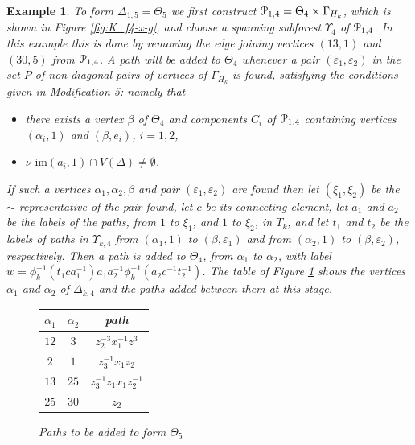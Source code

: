 \documentclass[a4paper,12pt]{article}
\renewcommand{\a}{\alpha }
\renewcommand{\b}{\beta }
\newcommand{\G}{\Gamma }
\newcommand{\D}{\Delta }
\newcommand{\e}{\varepsilon }
\newcommand{\T}{\Theta }
\newcommand{\U}{\Upsilon }
\newcommand{\cP}{{\cal{P}}}
\newcommand{\vim}{\nu\textrm{-im}}
\newtheorem{exam}[theorem]{Example}
\newenvironment{example}{\begin{exam} \rm}{\end{exam}}
\numberwithin{equation}{section}
\numberwithin{figure}{section}
\begin{document}
\begin{example}
To form $\D_{1,5}=\T_5$ we first construct $\cP_{1,4}=\T_4\times \G_{H_k}$,
which is shown in Figure \ref{fig:K_f4-x-g}, and choose a spanning
subforest $\U_4$ of $\cP_{1,4}$. In this example this is done by
removing the edge  joining vertices $(13,1)$ and $(30,5)$ from
$\cP_{1,4}$. A path will be added to $\T_4$ whenever a pair $(\e_1,\e_2)$
in the set $P$ of non-diagonal pairs of vertices of $\G_{H_k}$ is
found, satisfying the conditions given in Modification 5: namely
that
\begin{itemize}
\item
there exists a vertex $\b$ of $\T_4$ and  
components $C_i$ of $\cP_{1,4}$ containing vertices
$(\a_i,1)$ and $(\b, e_i)$, $i=1,2$, 
\item $\vim(a_i,1)\cap V(\D)\neq \emptyset$.
\end{itemize}
If such a vertices $\a_1,\a_2,\b$ and pair $(\e_1,\e_2)$ are found then 
let $(\xi_1,\xi_2)$ be the  $\sim$ representative of the pair found, let
$c$ be its connecting element, let $a_1$ and $a_2$ be the labels of  the paths, from
$1$ to $\xi_1$, and $1$ to $\xi_2$, in $T_k$, and let $t_1$ and $t_2$ be
the labels of paths in $\U_{k,4}$ from $(\a_1,1)$ to $(\b,\e_1)$ and 
from $(\a_2,1)$ to $(\b,\e_2)$, respectively. 
 Then a path is 
added to
$\T_4$, from $\a_1$ to $\a_2$, with label  $w=\phi_k^{-1}(t_1ca_1^{-1})a_1a_2^{-1}\phi_k^{-1}(a_2c^{-1}t_2^{-1})$.
The table of Figure \ref{tab:T5} shows the vertices $\a_1$ and 
$\a_2$ of $\D_{k,4}$ and the paths added between them at this stage. 
\begin{figure}
\begin{center}
\renewcommand{\arraystretch}{1.5}
\begin{tabular}{|c|c|c|}
\hline
$\a_1$& $\a_2$& path \\\hline\hline
$12$ &$3$ & $z_2^{-3}x_1^{-1}z^3$\\\hline
 $2$ & $1$ & $z_3^{-1}x_1z_2$ \\\hline
 $13$ & $25$ & $z_3^{-1}z_1x_1z_2^{-1}$ \\\hline
$25$ & $30$ & $z_2$\\ \hline
\end{tabular}
\renewcommand{\arraystretch}{1}
\end{center}
\caption{Paths to be added to form $\T_5$}
\label{tab:T5}
\end{figure}


\end{example}
\end{document}
